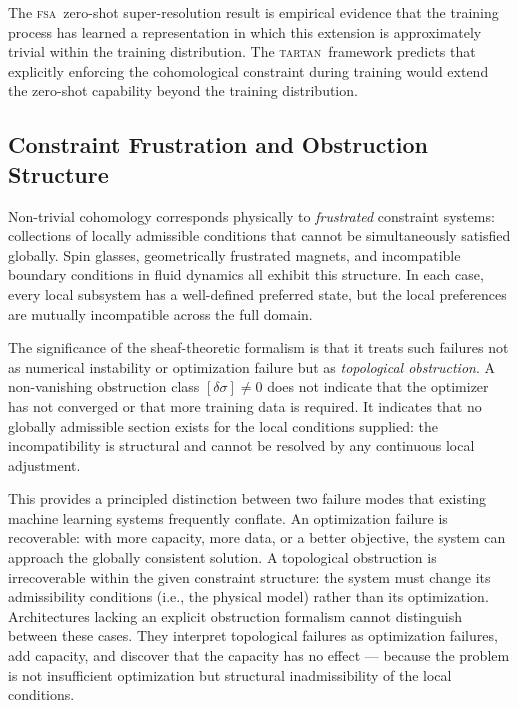 \documentclass[11pt,a4paper]{article}
\theoremstyle{plain}
\theoremstyle{definition}
\theoremstyle{remark}
\newcommand{\TARTAN}{\textup{\textsc{tartan}}}
\newcommand{\FSA}{\textup{\textsc{fsa}}}
\begin{document}
The \FSA\ zero-shot super-resolution result is empirical evidence that the
training process has learned a representation in which this extension is
approximately trivial within the training distribution. The \TARTAN\
framework predicts that explicitly enforcing the cohomological constraint
during training would extend the zero-shot capability beyond the training
distribution.

\subsection{Constraint Frustration and Obstruction Structure}

Non-trivial cohomology corresponds physically to \textit{frustrated}
constraint systems: collections of locally admissible conditions that cannot
be simultaneously satisfied globally. Spin glasses, geometrically frustrated
magnets, and incompatible boundary conditions in fluid dynamics all exhibit
this structure. In each case, every local subsystem has a well-defined
preferred state, but the local preferences are mutually incompatible across
the full domain.

The significance of the sheaf-theoretic formalism is that it treats such
failures not as numerical instability or optimization failure but as
\textit{topological obstruction}. A non-vanishing obstruction class
$[\delta\sigma] \neq 0$ does not indicate that the optimizer has not
converged or that more training data is required. It indicates that no
globally admissible section exists for the local conditions supplied:
the incompatibility is structural and cannot be resolved by any continuous
local adjustment.

This provides a principled distinction between two failure modes that
existing machine learning systems frequently conflate. An optimization
failure is recoverable: with more capacity, more data, or a better
objective, the system can approach the globally consistent solution. A
topological obstruction is irrecoverable within the given constraint
structure: the system must change its admissibility conditions (i.e., the
physical model) rather than its optimization. Architectures lacking an
explicit obstruction formalism cannot distinguish between these cases.
They interpret topological failures as optimization failures, add capacity,
and discover that the capacity has no effect --- because the problem is not
insufficient optimization but structural inadmissibility of the local
conditions.

\end{document}
